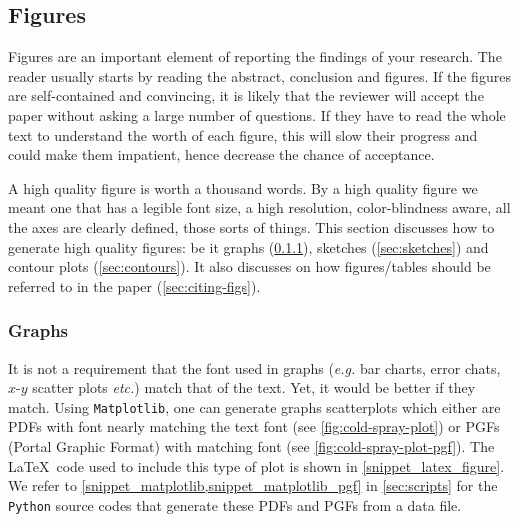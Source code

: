 \documentclass[authoryear,3p,times,preprint,review,fleqn]{elsarticle}
\makeatletter
\newcommand{\eg}{\textit{e.g.}\xspace}
\newcommand{\etc}{\textit{etc.}\@\xspace}
\numberwithin{equation}{section}
\theoremstyle{remark}
\makeatother
\begin{document}
\subsection{Figures}\label{sec:figs}


Figures are an important element of reporting the findings of your research. The reader usually starts by reading the abstract, conclusion and figures. If the figures are self-contained and convincing, it is likely that the reviewer will accept the paper without asking a large number of questions. If they have to read the whole text to understand the worth of each figure, this will slow their progress and could make them impatient, hence decrease the chance of acceptance. 

A high quality figure is worth a thousand words. By a high quality figure we meant one that has a legible font size, a high resolution, color-blindness aware, all the axes are clearly defined, those sorts of things. 
This section discusses how to generate high quality figures: be it graphs (\cref{sec:graphs}), sketches (\cref{sec:sketches}) and contour plots (\cref{sec:contours}). It also discusses on how figures/tables should be referred to in the paper (\cref{sec:citing-figs}).


\subsubsection{Graphs}\label{sec:graphs}

It is not a requirement that the font used in  graphs (\eg bar charts, error chats, $x\text{-}y$ scatter plots \etc)  match that of the text. Yet, it would be better if they match. Using  \texttt{Matplotlib}, one can generate graphs scatterplots which either are PDFs with font nearly matching the text font  (see \cref{fig:cold-spray-plot}) or PGFs (Portal Graphic Format) with matching font (see \cref{fig:cold-spray-plot-pgf}).  The \LaTeX\ code used to include this type of plot  is shown in \cref{snippet_latex_figure}. We refer to \cref{snippet_matplotlib,snippet_matplotlib_pgf} in \cref{sec:scripts} for the \texttt{Python} source codes that generate these PDFs and PGFs from a data file.
\end{document}
